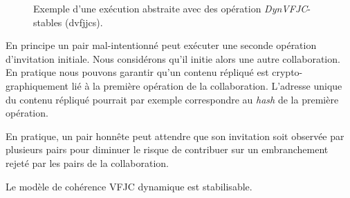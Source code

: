 \begin{figure}[htb]
\centering
{}
\caption[Stabilité \acl{VFJC} dynamique]{Exemple d'une exécution abstraite avec des opération \emph{DynVFJC}-stables (dvfjjcs).}
\label{fig:dvfjcs-example}
\end{figure}

En principe un pair mal-intentionné peut exécuter une seconde opération d'invitation initiale.
Nous considérons qu'il initie alors une autre collaboration.
En pratique nous pouvons garantir qu'un contenu répliqué est crypto-graphiquement lié à la première opération de la collaboration.
L'adresse unique du contenu répliqué pourrait par exemple correspondre au \emph{hash} de la première opération.

En pratique, un pair honnête peut attendre que son invitation soit observée par plusieurs pairs pour diminuer le risque de contribuer sur un embranchement rejeté par les pairs de la collaboration.

\begin{theorem}\label{th:stabilizable-dyn-vfjc}
Le modèle de cohérence \acl{VFJC} dynamique est stabilisable.
\end{theorem}

